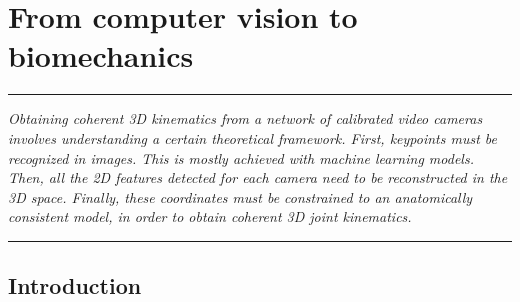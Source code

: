 
\lhead[\fancyplain{}{\leftmark}]%
      {\fancyplain{}{}} %
\chead[\fancyplain{}{}]%
      {\fancyplain{}{}}
\rhead[\fancyplain{}{}]%
      {\fancyplain{}{\rightmark}}%
\lfoot[\fancyplain{}{}]%
      {\fancyplain{}{}}
\cfoot[\fancyplain{}{\thepage}]%
      {\fancyplain{}{\thepage}} %
\rfoot[\fancyplain{}{}]%
     {\fancyplain{}{\scriptsize}}



\chapter{From computer vision to biomechanics}
\label{ch:2}


\begin{center}
\rule{0.7\linewidth}{.5pt}
\begin{minipage}{0.7\linewidth}
\smallskip

\textit{Obtaining coherent 3D kinematics from a network of calibrated video cameras involves understanding a certain theoretical framework. First, keypoints must be recognized in images. This is mostly achieved with machine learning models. Then, all the 2D features detected for each camera need to be reconstructed in the 3D space. Finally, these coordinates must be constrained to an anatomically consistent model, in order to obtain coherent 3D joint kinematics.}

\end{minipage}
\smallskip
\rule{0.7\linewidth}{.5pt}
\end{center}

\minitoc
\newpage

\section{Introduction}

